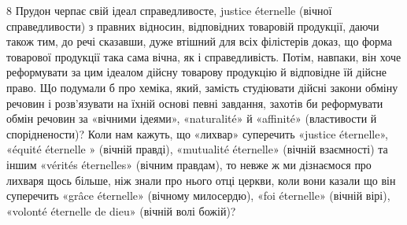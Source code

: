8 Прудон черпає свій ідеал справедливосте, justice éternelle (вічної
справедливости) з правних відносин, відповідних товаровій продукції,
даючи також тим, до речі сказавши, дуже втішний для всіх філістерів
доказ, що форма товарової продукції така сама вічна, як і справедливість.
Потім, навпаки, він хоче реформувати за цим ідеалом дійсну товарову
продукцію й відповідне їй дійсне право. Що подумали б про хеміка, який,
замість студіювати дійсні закони обміну речовин і розв’язувати на їхній
основі певні завдання, захотів би реформувати обмін речовин за «вічними
ідеями», «naturalité» й «affinité» (властивости й споріднености)? Коли
нам кажуть, що «лихвар» суперечить «justice éternelle», «équité éternelle
» (вічній правді), «mutualité éternelle» (вічній взаємності) та іншим
«vérités éternelles» (вічним правдам), то невже ж ми дізнаємося про лихваря
щось більше, ніж знали про нього отці церкви, коли вони казали
що він суперечить «grâce éternelle» (вічному милосердю), «foi éternelle»
(вічній вірі), «volonté éternelle de dieu» (вічній волі божій)?
